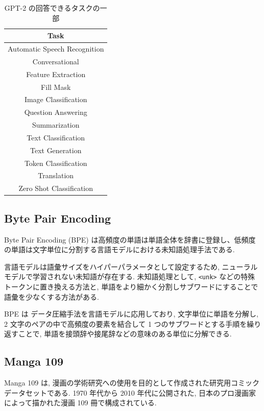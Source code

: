 \documentclass[twocolumn]{jarticle}     %
\begin{document}
\begin{table}[tbh]
  \begin{center}
    \caption{GPT-2 の回答できるタスクの一部}
    \begin{tabular}{c}
      \hline
      Task \\
      \hline
      Automatic Speech Recognition \\
      Conversational \\
      Feature Extraction \\
      Fill Mask \\
      Image Classification \\
      Question Answering \\
      Summarization \\
      Text Classification \\
      Text Generation \\
      Token Classification \\
      Translation \\
      Zero Shot Classification \\
      \hline
    \end{tabular}
    \label{tab:task}
  \end{center}
\end{table}

\subsection{Byte Pair Encoding}
Byte Pair Encoding (BPE) は高頻度の単語は単語全体を辞書に登録し、低頻度の単語は文字単位に分割する言語モデルにおける未知語処理手法である.

言語モデルは語彙サイズをハイパーパラメータとして設定するため, ニューラルモデルで学習されない未知語が存在する.
未知語処理として, \verb|<unk>| などの特殊トークンに置き換える方法と, 単語をより細かく分割しサブワードにすることで語彙を少なくする方法がある.

BPE は
データ圧縮手法を言語モデルに応用しており,
文字単位に単語を分解し, 2 文字のペアの中で高頻度の要素を結合して 1 つのサブワードとする手順を繰り返すことで,
単語を接頭辞や接尾辞などの意味のある単位に分解できる.

\subsection{Manga 109}
Manga 109 \cite{mtap_matsui_2017} は,
漫画の学術研究への使用を目的として作成された研究用コミックデータセットである.
1970 年代から 2010 年代に公開された, 日本のプロ漫画家によって描かれた漫画 109 冊で構成されている.
\end{document}
